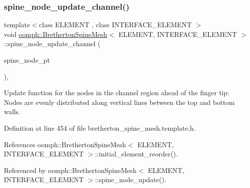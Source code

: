 \subsubsection{\texorpdfstring{spine\+\_\+node\+\_\+update\+\_\+channel()}{spine\_node\_update\_channel()}}
{\footnotesize\ttfamily template$<$class E\+L\+E\+M\+E\+NT , class I\+N\+T\+E\+R\+F\+A\+C\+E\+\_\+\+E\+L\+E\+M\+E\+NT $>$ \\
void \hyperlink{classoomph_1_1BrethertonSpineMesh}{oomph\+::\+Bretherton\+Spine\+Mesh}$<$ E\+L\+E\+M\+E\+NT, I\+N\+T\+E\+R\+F\+A\+C\+E\+\_\+\+E\+L\+E\+M\+E\+NT $>$\+::spine\+\_\+node\+\_\+update\+\_\+channel (\begin{DoxyParamCaption}\item[{Spine\+Node $\ast$}]{spine\+\_\+node\+\_\+pt }\end{DoxyParamCaption})\hspace{0.3cm}{\ttfamily [inline]}, {\ttfamily [protected]}}



Update function for the nodes in the channel region ahead of the finger tip\+: Nodes are evenly distributed along vertical lines between the top and bottom walls. 



Definition at line 454 of file bretherton\+\_\+spine\+\_\+mesh.\+template.\+h.



References oomph\+::\+Bretherton\+Spine\+Mesh$<$ E\+L\+E\+M\+E\+N\+T, I\+N\+T\+E\+R\+F\+A\+C\+E\+\_\+\+E\+L\+E\+M\+E\+N\+T $>$\+::initial\+\_\+element\+\_\+reorder().



Referenced by oomph\+::\+Bretherton\+Spine\+Mesh$<$ E\+L\+E\+M\+E\+N\+T, I\+N\+T\+E\+R\+F\+A\+C\+E\+\_\+\+E\+L\+E\+M\+E\+N\+T $>$\+::spine\+\_\+node\+\_\+update().

\mbox{\label{classoomph_1_1BrethertonSpineMesh_a0446cb0efaa31739f51ae0534a73d116}} 
